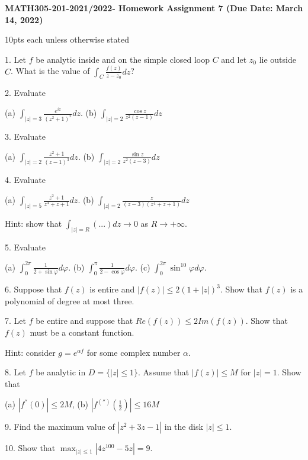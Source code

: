 %
%
\textwidth=6.8in
\textheight=8.8in
\oddsidemargin=-0.1in
\evensidemargin=-0.1in








\noindent
{\bf MATH305-201-2021/2022- Homework Assignment 7 (Due Date: March 14, 2022) }

\vskip 0.5cm

 10pts each unless otherwise stated

\medskip


1. Let $ f$ be analytic inside and on the simple closed loop $C$ and let $z_0$ lie outside $C$. What is the value of $ \int_{C} \frac{f(z)}{ z-z_0 } dz $?

\medskip


2. Evaluate

(a) $\int_{|z|=3} \frac{e^{iz}}{ (z^2+1)^2} dz$.   (b) $ \int_{|z|=2} \frac{ \cos z}{ z^2 (z-1)} dz$

\medskip


3. Evaluate

(a) $\int_{|z|=2} \frac{z^2+1}{ (z-1)^3} dz$. (b) $ \int_{|z|=2} \frac{\sin z}{z^2 (z-3)} dz $

\medskip

4. Evaluate

(a) $\int_{|z|=5} \frac{ z^2+1}{ z^4+ z+1} dz$. (b) $ \int_{|z|=2} \frac{z}{ (z-3) (z^4+z+1)} dz $

Hint: show that $ \int_{|z|=R} (...) dz  \to 0$ as $R\to +\infty$.

\medskip

5. Evaluate

(a) $ \int_0^{2\pi} \frac{1}{2+\sin\varphi} d \varphi $.  (b) $ \int_0^\pi \frac{ 1}{ 2-\cos \varphi} d \varphi$. (c) $\int_0^{2\pi} \sin^{10} \varphi d \varphi $.

\medskip

6. Suppose that $ f(z)$ is entire and $ |f(z)| \leq 2 (1+|z|)^3$. Show that $ f(z)$ is a polynomial of degree at most three.

\medskip


7. Let $f$ be entire and suppose that $ Re (f(z)) \leq 2 Im (f(z))$. Show that $ f(z) $ must be a constant function.


Hint: consider $ g=e^{ \alpha  f}$ for some complex number $ \alpha $.

\medskip


8. Let $ f$ be analytic in $D= \{ |z|\leq 1\}$. Assume that $ |f(z)|\leq M$ for $|z|=1$. Show that

(a) $ |f^{''} (0)|\leq 2M$, (b) $ |f^{('')} (\frac{1}{2})| \leq 16 M$


\medskip

9. Find the maximum value of $ |z^2+3z-1|$ in the disk $ |z|\leq 1$.

\medskip

10. Show that $ \max_{|z|\leq 1} |4 z^{100}-5z| = 9$.










